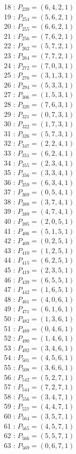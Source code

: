 \documentclass{article}
\begin{document}
{\begin{multicols}{2}
18 : $P_{239}=( 6, 4, 2, 1 )$\\
19 : $P_{254}=( 5, 6, 2, 1 )$\\
20 : $P_{255}=( 6, 6, 2, 1 )$\\
21 : $P_{256}=( 7, 6, 2, 1 )$\\
22 : $P_{262}=( 5, 7, 2, 1 )$\\
23 : $P_{264}=( 7, 7, 2, 1 )$\\
24 : $P_{272}=( 7, 0, 3, 1 )$\\
25 : $P_{276}=( 3, 1, 3, 1 )$\\
26 : $P_{294}=( 5, 3, 3, 1 )$\\
27 : $P_{306}=( 1, 5, 3, 1 )$\\
28 : $P_{320}=( 7, 6, 3, 1 )$\\
29 : $P_{321}=( 0, 7, 3, 1 )$\\
30 : $P_{322}=( 1, 7, 3, 1 )$\\
31 : $P_{326}=( 5, 7, 3, 1 )$\\
32 : $P_{347}=( 2, 2, 4, 1 )$\\
33 : $P_{351}=( 6, 2, 4, 1 )$\\
34 : $P_{355}=( 2, 3, 4, 1 )$\\
35 : $P_{356}=( 3, 3, 4, 1 )$\\
36 : $P_{359}=( 6, 3, 4, 1 )$\\
37 : $P_{369}=( 0, 5, 4, 1 )$\\
38 : $P_{388}=( 3, 7, 4, 1 )$\\
39 : $P_{389}=( 4, 7, 4, 1 )$\\
40 : $P_{395}=( 2, 0, 5, 1 )$\\
41 : $P_{406}=( 5, 1, 5, 1 )$\\
42 : $P_{409}=( 0, 2, 5, 1 )$\\
43 : $P_{410}=( 1, 2, 5, 1 )$\\
44 : $P_{415}=( 6, 2, 5, 1 )$\\
45 : $P_{419}=( 2, 3, 5, 1 )$\\
46 : $P_{439}=( 6, 5, 5, 1 )$\\
47 : $P_{442}=( 1, 6, 5, 1 )$\\
48 : $P_{461}=( 4, 0, 6, 1 )$\\
49 : $P_{471}=( 6, 1, 6, 1 )$\\
50 : $P_{482}=( 1, 3, 6, 1 )$\\
51 : $P_{489}=( 0, 4, 6, 1 )$\\
52 : $P_{490}=( 1, 4, 6, 1 )$\\
53 : $P_{492}=( 3, 4, 6, 1 )$\\
54 : $P_{501}=( 4, 5, 6, 1 )$\\
55 : $P_{508}=( 3, 6, 6, 1 )$\\
56 : $P_{542}=( 5, 2, 7, 1 )$\\
57 : $P_{544}=( 7, 2, 7, 1 )$\\
58 : $P_{556}=( 3, 4, 7, 1 )$\\
59 : $P_{557}=( 4, 4, 7, 1 )$\\
60 : $P_{564}=( 3, 5, 7, 1 )$\\
61 : $P_{565}=( 4, 5, 7, 1 )$\\
62 : $P_{566}=( 5, 5, 7, 1 )$\\
63 : $P_{569}=( 0, 6, 7, 1 )$\\
\end{multicols}
}
\end{document}

